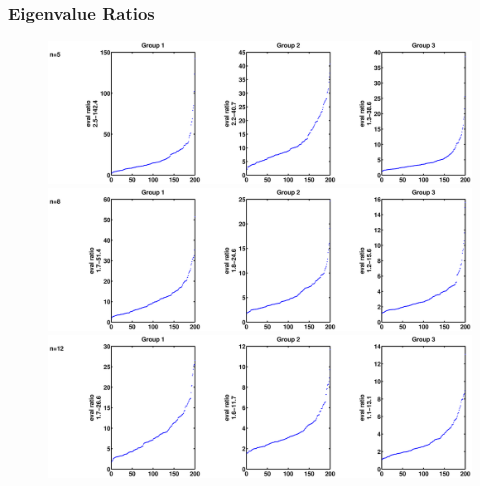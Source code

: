 \documentclass[11pt]{article}
\begin{document}
\subsubsection{Eigenvalue Ratios}
\begin{figure}[H]
\includegraphics[trim= 20 0 50 0, clip, width=\textwidth]{pictures/refine_cyclicity_output_n5_evals.eps}
\includegraphics[trim= 20 0 50 0, clip, width=\textwidth]{pictures/refine_cyclicity_output_n8_evals.eps}
\includegraphics[trim= 20 0 50 0, clip, width=\textwidth]{pictures/refine_cyclicity_output_n12_evals.eps}
\end{figure}
\end{document}
